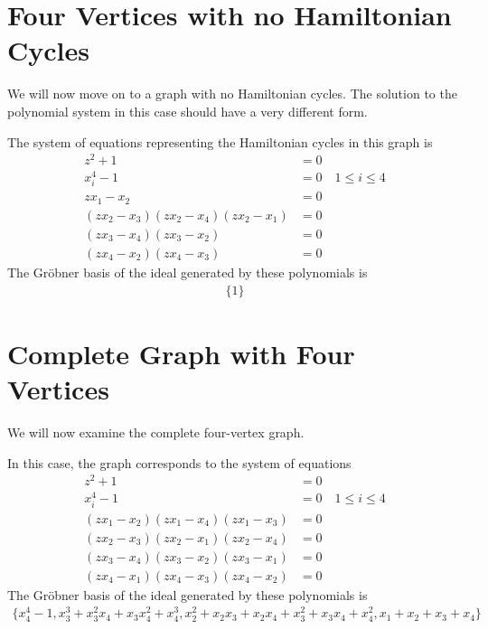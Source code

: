 \documentclass[letterpaper]{article}
\newcommand{\aln}[1]{\begin{align*} #1 \end{align*}} %
\begin{document}
\section{Four Vertices with no Hamiltonian Cycles}
We will now move on to a graph with no Hamiltonian cycles. The solution to the polynomial system in this case should have a very different form.
\begin{center}
\end{center}
The system of equations representing the Hamiltonian cycles in this graph is
\aln{
  z^2 + 1 &= 0\\
  x_i^4 - 1 &= 0 \quad 1 \leq i \leq 4\\
  z x_1 - x_2 &= 0\\
  (z x_2 - x_3) (z x_2 - x_4) (z x_2 - x_1) &= 0\\
  (z x_3 - x_4) (z x_3 - x_2) &= 0\\
  (z x_4 - x_2) (z x_4 - x_3) &= 0
}
The Gr\"obner basis of the ideal generated by these polynomials is
\aln{
  \{1\}
}

\newpage

\section{Complete Graph with Four Vertices}
We will now examine the complete four-vertex graph.
\begin{center}
\end{center}
In this case, the graph corresponds to the system of equations
\aln{
  z^2 + 1 &= 0\\
  x_i^4 - 1 &= 0 \quad 1 \leq i \leq 4\\
  (z x_1 - x_2) (z x_1 - x_4) (z x_1 - x_3) &= 0\\
  (z x_2 - x_3) (z x_2 - x_1) (z x_2 - x_4) &= 0\\
  (z x_3 - x_4) (z x_3 - x_2) (z x_3 - x_1) &= 0\\
  (z x_4 - x_1) (z x_4 - x_3) (z x_4 - x_2) &= 0
}
The Gr\"obner basis of the ideal generated by these polynomials is
\aln{
  \{x_4^4-1, x_3^3+x_3^2x_4+x_3x_4^2+x_4^3, x_2^2+x_2x_3+x_2x_4+x_3^2+x_3x_4+x_4^2, x_1+x_2+x_3+x_4\}
}
\end{document}
